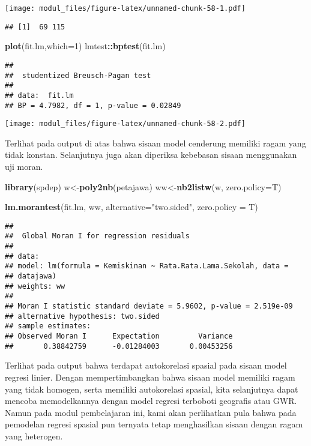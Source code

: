 \documentclass[
]{book}
\newenvironment{Shaded}{\begin{snugshade}}{\end{snugshade}}
\newcommand{\DataTypeTok}[1]{\textcolor[rgb]{0.13,0.29,0.53}{#1}}
\newcommand{\DecValTok}[1]{\textcolor[rgb]{0.00,0.00,0.81}{#1}}
\newcommand{\KeywordTok}[1]{\textcolor[rgb]{0.13,0.29,0.53}{\textbf{#1}}}
\newcommand{\NormalTok}[1]{#1}
\newcommand{\OperatorTok}[1]{\textcolor[rgb]{0.81,0.36,0.00}{\textbf{#1}}}
\newcommand{\StringTok}[1]{\textcolor[rgb]{0.31,0.60,0.02}{#1}}
\begin{document}
\texttt{[image: modul\_files/figure-latex/unnamed-chunk-58-1.pdf]}

\begin{verbatim}
## [1]  69 115
\end{verbatim}

\begin{Shaded}
\begin{Highlighting}[]
\KeywordTok{plot}\NormalTok{(fit.lm,}\DataTypeTok{which=}\DecValTok{1}\NormalTok{)}
\NormalTok{lmtest}\OperatorTok{::}\KeywordTok{bptest}\NormalTok{(fit.lm)}
\end{Highlighting}
\end{Shaded}

\begin{verbatim}
## 
##  studentized Breusch-Pagan test
## 
## data:  fit.lm
## BP = 4.7982, df = 1, p-value = 0.02849
\end{verbatim}

\texttt{[image: modul\_files/figure-latex/unnamed-chunk-58-2.pdf]}

Terlihat pada output di atas bahwa sisaan model cenderung memiliki ragam yang tidak konstan. Selanjutnya juga akan diperiksa kebebasan sisaan menggunakan uji moran.

\begin{Shaded}
\begin{Highlighting}[]
\KeywordTok{library}\NormalTok{(spdep)}
\NormalTok{w\textless{}{-}}\KeywordTok{poly2nb}\NormalTok{(petajawa)}
\NormalTok{ww\textless{}{-}}\KeywordTok{nb2listw}\NormalTok{(w, }\DataTypeTok{zero.policy=}\NormalTok{T)}

\KeywordTok{lm.morantest}\NormalTok{(fit.lm, ww, }\DataTypeTok{alternative=}\StringTok{"two.sided"}\NormalTok{, }\DataTypeTok{zero.policy =}\NormalTok{ T)}
\end{Highlighting}
\end{Shaded}

\begin{verbatim}
## 
##  Global Moran I for regression residuals
## 
## data:  
## model: lm(formula = Kemiskinan ~ Rata.Rata.Lama.Sekolah, data =
## datajawa)
## weights: ww
## 
## Moran I statistic standard deviate = 5.9602, p-value = 2.519e-09
## alternative hypothesis: two.sided
## sample estimates:
## Observed Moran I      Expectation         Variance 
##       0.38842759      -0.01284003       0.00453256
\end{verbatim}

Terlihat pada output bahwa terdapat autokorelasi spasial pada sisaan model regresi linier. Dengan mempertimbangkan bahwa sisaan model memiliki ragam yang tidak homogen, serta memiliki autokorelasi spasial, kita selanjutnya dapat mencoba memodelkannya dengan model regresi terboboti geografis atau GWR. Namun pada modul pembelajaran ini, kami akan perlihatkan pula bahwa pada pemodelan regresi spasial pun ternyata tetap menghasilkan sisaan dengan ragam yang heterogen.
\end{document}
